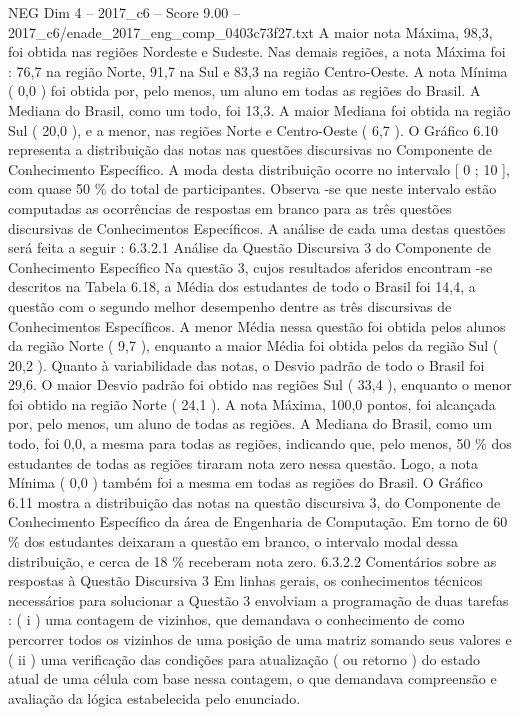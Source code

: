 \begin{textsample}{NEG Dim 4 – 2017\_c6 – Score 9.00 – 2017\_c6/enade\_2017\_eng\_comp\_0403c73f27.txt}
A maior nota Máxima, 98,3, foi obtida nas regiões Nordeste e Sudeste.
Nas demais regiões, a nota Máxima foi : 76,7 na região Norte, 91,7 na Sul e 83,3 na região Centro-Oeste.
A nota Mínima ( 0,0 ) foi obtida por, pelo menos, um aluno em todas as regiões do Brasil.
A Mediana do Brasil, como um todo, foi 13,3.
A maior Mediana foi obtida na região Sul ( 20,0 ), e a menor, nas regiões Norte e Centro-Oeste ( 6,7 ).
O Gráfico 6.10 representa a distribuição das notas nas questões discursivas no Componente de Conhecimento Específico.
A moda desta distribuição ocorre no intervalo [ 0 ; 10 ], com quase 50 \% do total de participantes.
Observa -se que neste intervalo estão computadas as ocorrências de respostas em branco para as três questões discursivas de Conhecimentos Específicos.
A análise de cada uma destas questões será feita a seguir : 6.3.2.1 Análise da Questão Discursiva 3 do Componente de Conhecimento Específico Na questão 3, cujos resultados aferidos encontram -se descritos na Tabela 6.18, a Média dos estudantes de todo o Brasil foi 14,4, a questão com o segundo melhor desempenho dentre as três discursivas de Conhecimentos Específicos.
A menor Média nessa questão foi obtida pelos alunos da região Norte ( 9,7 ), enquanto a maior Média foi obtida pelos da região Sul ( 20,2 ).
Quanto à variabilidade das notas, o Desvio padrão de todo o Brasil foi 29,6.
O maior Desvio padrão foi obtido nas regiões Sul ( 33,4 ), enquanto o menor foi obtido na região Norte ( 24,1 ).
A nota Máxima, 100,0 pontos, foi alcançada por, pelo menos, um aluno de todas as regiões.
A Mediana do Brasil, como um todo, foi 0,0, a mesma para todas as regiões, indicando que, pelo menos, 50 \% dos estudantes de todas as regiões tiraram nota zero nessa questão.
Logo, a nota Mínima ( 0,0 ) também foi a mesma em todas as regiões do Brasil.
O Gráfico 6.11 mostra a distribuição das notas na questão discursiva 3, do Componente de Conhecimento Específico da área de Engenharia de Computação.
Em torno de 60 \% dos estudantes deixaram a questão em branco, o intervalo modal dessa distribuição, e cerca de 18 \% receberam nota zero. 6.3.2.2 Comentários sobre as respostas à Questão Discursiva 3 Em linhas gerais, os conhecimentos técnicos necessários para solucionar a Questão 3 envolviam a programação de duas tarefas : ( i ) uma contagem de vizinhos, que demandava o conhecimento de como percorrer todos os vizinhos de uma posição de uma matriz somando seus valores e ( ii ) uma verificação das condições para atualização ( ou retorno ) do estado atual de uma célula com base nessa contagem, o que demandava compreensão e avaliação da lógica estabelecida pelo enunciado.

\end{textsample}
